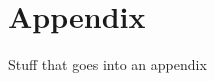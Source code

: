 \documentclass[12pt]{article}
\begin{document}
\lipsum[5-6]








\newpage\clearpage
\appendix 
\setcounter{figure}{0} \renewcommand{\thefigure}{A\arabic{figure}}
\setcounter{table}{0} \renewcommand{\thetable}{A\arabic{table}}

\section*{Appendix}
Stuff that goes into an appendix

\lipsum[7]
\end{document}
